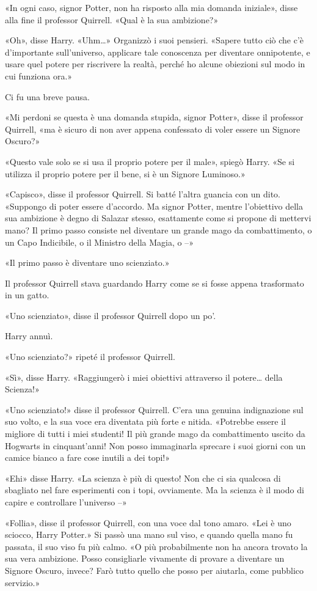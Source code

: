 «In ogni caso, signor Potter, non ha risposto alla mia domanda iniziale», disse alla fine il professor Quirrell. «Qual è la sua ambizione?»

«Oh», disse Harry. «Uhm…» Organizzò i suoi pensieri. «Sapere tutto ciò che c’è d’importante sull’universo, applicare tale conoscenza per diventare onnipotente, e usare quel potere per riscrivere la realtà, perché ho alcune obiezioni sul modo in cui funziona ora.»

Ci fu una breve pausa.

«Mi perdoni se questa è una domanda stupida, signor Potter», disse il professor Quirrell, «ma è sicuro di non aver appena confessato di voler essere un Signore Oscuro?»

«Questo vale solo se si usa il proprio potere per il male», spiegò Harry. «Se si utilizza il proprio potere per il bene, si è un Signore Luminoso.»

«Capisco», disse il professor Quirrell. Si batté l’altra guancia con un dito. «Suppongo di poter essere d’accordo. Ma signor Potter, mentre l’obiettivo della sua ambizione è degno di Salazar stesso, esattamente come si propone di mettervi mano? Il primo passo consiste nel diventare un grande mago da combattimento, o un Capo Indicibile, o il Ministro della Magia, o –»

«Il primo passo è diventare uno scienziato.»

Il professor Quirrell stava guardando Harry come se si fosse appena trasformato in un gatto.

«Uno scienziato», disse il professor Quirrell dopo un po’.

Harry annuì.

«Uno scienziato?» ripeté il professor Quirrell.

«Sì», disse Harry. «Raggiungerò i miei obiettivi attraverso il potere… della Scienza!»

«Uno scienziato!» disse il professor Quirrell. C’era una genuina indignazione sul suo volto, e la sua voce era diventata più forte e nitida. «Potrebbe essere il migliore di tutti i miei studenti! Il più grande mago da combattimento uscito da Hogwarts in cinquant’anni! Non posso immaginarla sprecare i suoi giorni con un camice bianco a fare cose inutili a dei topi!»

«Ehi» disse Harry. «La scienza è più di questo! Non che ci sia qualcosa di sbagliato nel fare esperimenti con i topi, ovviamente. Ma la scienza è il modo di capire e controllare l’universo –»

«Follia», disse il professor Quirrell, con una voce dal tono amaro. «Lei è uno sciocco, Harry Potter.» Si passò una mano sul viso, e quando quella mano fu passata, il suo viso fu più calmo. «O più probabilmente non ha ancora trovato la sua vera ambizione. Posso consigliarle vivamente di provare a diventare un Signore Oscuro, invece? Farò tutto quello che posso per aiutarla, come pubblico servizio.»

